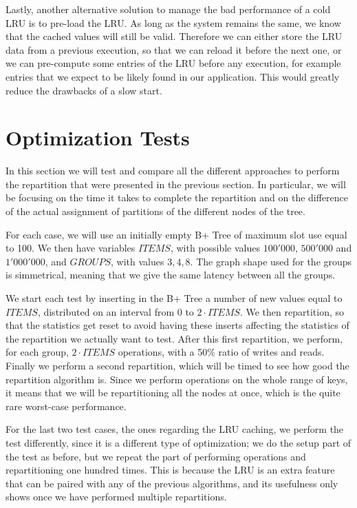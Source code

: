 Lastly, another alternative solution to manage the bad performance of a cold LRU is to pre-load the LRU. As long as the system remains the same, we know that the cached values will still be valid. Therefore we can either store the LRU data from a previous execution, so that we can reload it before the next one, or we can pre-compute some entries of the LRU before any execution, for example entries that we expect to be likely found in our application. This would greatly reduce the drawbacks of a slow start.

\section{Optimization Tests}\label{sec:optimization-tests}
In this section we will test and compare all the different approaches to perform the repartition that were presented in the previous section. 
In particular, we will be focusing on the time it takes to complete the repartition and on the difference of the actual assignment of partitions of the different nodes of the tree.

For each case, we will use an initially empty B+ Tree of maximum slot use equal to 100. We then have variables $ITEMS$, with possible values $100'000$, $500'000$ and $1'000'000$, and $GROUPS$, with values $3, 4, 8$. The graph shape used for the groups is simmetrical, meaning that we give the same latency between all the groups.

We start each test by inserting in the B+ Tree a number of new values equal to $ITEMS$, distributed on an interval from 0 to $2\cdot ITEMS$. We then repartition, so that the statistics get reset to avoid having these inserts affecting the statistics of the repartition we actually want to test. After this first repartition, we perform, for each group, $2\cdot ITEMS$ operations, with a 50\% ratio of writes and reads. Finally we perform a second repartition, which will be timed to see how good the repartition algorithm is. Since we perform operations on the whole range of keys, it means that we will be repartitioning all the nodes at once, which is the quite rare worst-case performance.

For the last two test cases, the ones regarding the LRU caching, we perform the test differently, since it is a different type of optimization; we do the setup part of the test as before, but we repeat the part of performing operations and repartitioning one hundred times. This is because the LRU is an extra feature that can be paired with any of the previous algorithms, and its usefulness only shows once we have performed multiple repartitions.

